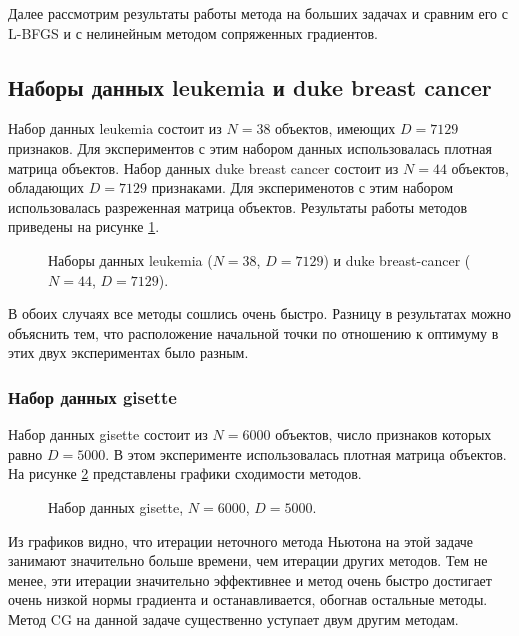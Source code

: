 \documentclass[12pt]{article}
\begin{document}
	Далее рассмотрим результаты работы метода на больших задачах и сравним его с L-BFGS и с нелинейным методом сопряженных градиентов. 
	
	\subsection{Наборы данных leukemia и duke breast cancer}
	
		Набор данных leukemia состоит из $N = 38$ объектов, имеющих $D = 7129$ признаков. Для экспериментов с этим набором данных использовалась плотная матрица объектов. Набор данных duke breast cancer состоит из $N = 44$ объектов, обладающих $D = 7129$ признаками. Для эксперименотов с этим набором использовалась разреженная матрица объектов. Результаты работы методов приведены на рисунке \ref{deseases}.
	
	
		\begin{figure}[!h]
			\centering
			\subfloat{
				\scalebox{0.9}{
					
				}
			}
			\subfloat{
				\scalebox{0.9}{
		                		
				}
			}
			\caption{Наборы данных leukemia ($N = 38$, $D = 7129$) и duke breast-cancer ($N = 44$, $D = 7129$).}
			\label{deseases}
		\end{figure}
	
	В обоих случаях все методы сошлись очень быстро. Разницу в результатах можно объяснить тем, что расположение начальной точки по отношению к оптимуму в этих двух экспериментах было разным.
	
	\subsubsection{Набор данных gisette}
	
		Набор данных gisette состоит из $N = 6000$ объектов, число признаков которых равно $D  = 5000$. В этом эксперименте использовалась плотная матрица объектов. На рисунке \ref{Gisette} представлены графики сходимости методов. 
		
		\begin{figure}[!h]
			\centering
			\subfloat{
				\scalebox{1.2}{
					
				}
			}
			\caption{Набор данных gisette, $N = 6000$, $D = 5000$.}
			\label{Gisette}
		\end{figure}
	
		Из графиков видно, что итерации неточного метода Ньютона на этой задаче занимают значительно больше времени, чем итерации других методов. Тем не менее, эти итерации значительно эффективнее и метод очень быстро достигает очень низкой нормы градиента и останавливается, обогнав остальные методы. Метод CG на данной задаче существенно уступает двум другим методам. 
	
\end{document}
